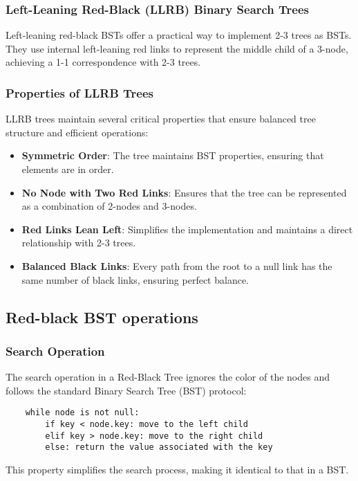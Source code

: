 \documentclass{article}
\begin{document}
\subsubsection{Left-Leaning Red-Black (LLRB) Binary Search Trees}

Left-leaning red-black BSTs offer a practical way to implement 2-3 trees as BSTs. They use internal left-leaning red links to represent the middle child of a 3-node, achieving a 1-1 correspondence with 2-3 trees.

\subsubsection{Properties of LLRB Trees}
LLRB trees maintain several critical properties that ensure balanced tree structure and efficient operations:

\begin{itemize}
    \item \textbf{Symmetric Order}: The tree maintains BST properties, ensuring that elements are in order.
    \item \textbf{No Node with Two Red Links}: Ensures that the tree can be represented as a combination of 2-nodes and 3-nodes.
    \item \textbf{Red Links Lean Left}: Simplifies the implementation and maintains a direct relationship with 2-3 trees.
    \item \textbf{Balanced Black Links}: Every path from the root to a null link has the same number of black links, ensuring perfect balance.
\end{itemize}

\subsection{Red-black BST operations}

\subsubsection{Search Operation}
The search operation in a Red-Black Tree ignores the color of the nodes and follows the standard Binary Search Tree (BST) protocol:
\begin{verbatim}
    while node is not null:
        if key < node.key: move to the left child
        elif key > node.key: move to the right child
        else: return the value associated with the key
\end{verbatim}
This property simplifies the search process, making it identical to that in a BST.
\end{document}
